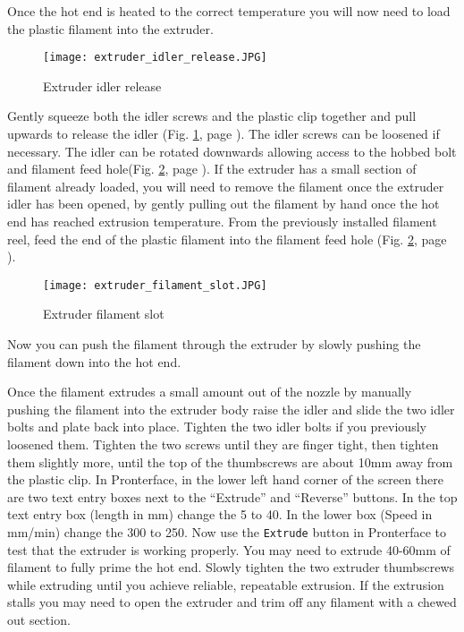 Once the hot end is heated to the correct temperature you will now need to load the plastic filament into the extruder.
\begin{figure}[hbt]
\centering
\texttt{[image: extruder\_idler\_release.JPG]}
\caption{Extruder idler release}
\label{fig:extruder_idler_release}
\end{figure}
Gently squeeze both the idler screws and the plastic clip together and pull upwards to release the idler (Fig. \ref{fig:extruder_idler_release}, page \pageref{fig:extruder_idler_release}). The idler screws can be loosened if necessary. The idler can be rotated downwards allowing access to the hobbed bolt and filament feed hole(Fig. \ref{fig:extruder_filament_slot}, page \pageref{fig:extruder_filament_slot}). If the extruder has a small section of filament already loaded, you will need to remove the filament once the extruder idler has been opened, by gently pulling out the filament by hand once the hot end has reached extrusion temperature. From the previously installed filament reel, feed the end of the plastic filament into the filament feed hole
(Fig. \ref{fig:extruder_filament_slot}, page \pageref{fig:extruder_filament_slot}).
\begin{figure}[hbt]
\centering
\texttt{[image: extruder\_filament\_slot.JPG]}
\caption{Extruder filament slot}
\label{fig:extruder_filament_slot}
\end{figure}
Now you can push the filament through the extruder by slowly pushing the filament down into the hot end.

Once the filament extrudes a small amount out of the nozzle by manually pushing the filament into the extruder body raise the idler and slide the two idler bolts and plate back into place. Tighten the two idler bolts if you previously loosened them. Tighten the two screws until they are finger tight, then tighten them slightly more, until the top of the thumbscrews are about 10mm away from the plastic clip. In Pronterface, in the lower left hand corner of the screen there are two text entry boxes next to the ``Extrude'' and ``Reverse'' buttons. In the top text entry box (length in mm) change the 5 to 40. In the lower box (Speed in mm/min) change the 300 to 250. Now use the \texttt{Extrude} button in Pronterface to test that the extruder is working properly. You may need to extrude 40-60mm of filament to fully prime the hot end. Slowly tighten the two extruder thumbscrews while extruding until you achieve reliable, repeatable extrusion. If the extrusion stalls you may need to open the extruder and trim off any filament with a chewed out section.

